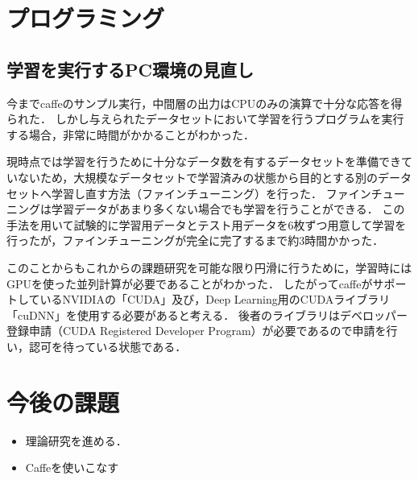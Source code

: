 \documentclass[a4paper,10pt]{jsarticle}
\begin{document}
\section{プログラミング}
\subsection{学習を実行するPC環境の見直し}
今までcaffeのサンプル実行，中間層の出力はCPUのみの演算で十分な応答を得られた．
しかし与えられたデータセットにおいて学習を行うプログラムを実行する場合，非常に時間がかかることがわかった．

現時点では学習を行うために十分なデータ数を有するデータセットを準備できていないため，大規模なデータセットで学習済みの状態から目的とする別のデータセットへ学習し直す方法（ファインチューニング）を行った．
ファインチューニングは学習データがあまり多くない場合でも学習を行うことができる．
この手法を用いて試験的に学習用データとテスト用データを6枚ずつ用意して学習を行ったが，ファインチューニングが完全に完了するまで約3時間かかった．

このことからもこれからの課題研究を可能な限り円滑に行うために，学習時にはGPUを使った並列計算が必要であることがわかった．
したがってcaffeがサポートしているNVIDIAの「CUDA」及び，Deep Learning用のCUDAライブラリ「cuDNN」を使用する必要があると考える．
後者のライブラリはデベロッパー登録申請（CUDA Registered Developer Program）が必要であるので申請を行い，認可を待っている状態である．

\section{今後の課題}
\begin{itemize}
 \item 理論研究を進める．
 \item Caffeを使いこなす
\end{itemize}
\end{document}
